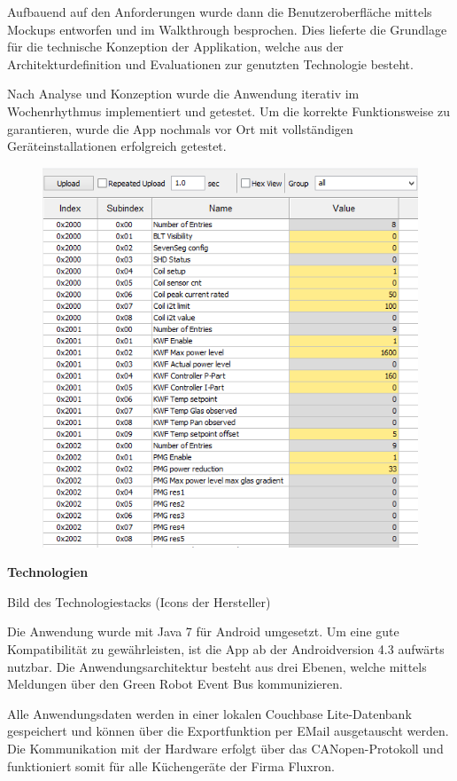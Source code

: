 Aufbauend auf den Anforderungen wurde dann die Benutzeroberfläche mittels Mockups entworfen und im Walkthrough besprochen. Dies lieferte die Grundlage für die technische Konzeption der Applikation, welche aus der Architekturdefinition und Evaluationen zur genutzten Technologie besteht.

Nach Analyse und Konzeption wurde die Anwendung iterativ im Wochenrhythmus implementiert und getestet. Um die korrekte Funktionsweise zu garantieren, wurde die App nochmals vor Ort mit vollständigen Geräteinstallationen erfolgreich getestet.

\begin{figure}
\includegraphics[scale=0.4]{analysis/res/flxaccess}
\end{figure}
\textbf{Technologien}

Bild des Technologiestacks (Icons der Hersteller)

Die Anwendung wurde mit Java 7 für Android umgesetzt. Um eine gute Kompatibilität zu gewährleisten, ist die App ab der Androidversion 4.3 aufwärts nutzbar. Die Anwendungsarchitektur besteht aus drei Ebenen, welche mittels Meldungen über den Green Robot Event Bus kommunizieren.

Alle Anwendungsdaten werden in einer lokalen Couchbase Lite-Datenbank gespeichert und können über die Exportfunktion per EMail ausgetauscht werden. Die Kommunikation mit der Hardware erfolgt über das CANopen-Protokoll und funktioniert somit für alle Küchengeräte der Firma Fluxron.

